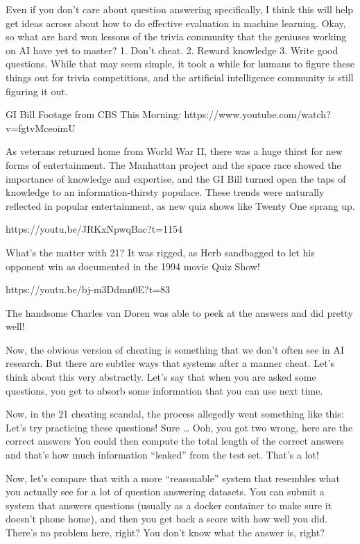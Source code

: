 Even if you don’t care about question answering specifically, I think this will help get ideas across about how to do effective evaluation in machine learning.
Okay, so what are hard won lessons of the trivia community that the geniuses working on AI have yet to master?  1.  Don’t cheat.  2.  Reward knowledge 3. Write good questions.  While that may seem simple, it took a while for humans to figure these things out for trivia competitions, and the artificial intelligence community is still figuring it out.

GI Bill Footage from CBS This Morning:
https://www.youtube.com/watch?v=fgtvMceoimU

As veterans returned home from World War II, there was a huge thirst for new forms of entertainment.  The Manhattan project and the space race showed the importance of knowledge and expertise, and the GI Bill turned open the taps of knowledge to an information-thirsty populace.  These trends were naturally reflected in popular entertainment, as new quiz shows like Twenty One sprang up.

https://youtu.be/JRKxNpwqBac?t=1154

What’s the matter with 21?  It was rigged, as Herb sandbagged to let his opponent win as documented in the 1994 movie Quiz Show!  

https://youtu.be/bj-m3Ddmn0E?t=83

The handsome Charles van Doren was able to peek at the answers and did pretty well!

Now, the obvious version of cheating is something that we don’t often see in AI research.  But there are subtler ways that systems after a manner cheat.  Let’s think about this very abstractly.  Let’s say that when you are asked some questions, you get to absorb some information that you can use next time.

Now, in the 21 cheating scandal, the process allegedly went something like this: 
Let’s try practicing these questions!
Sure …
Ooh, you got two wrong, here are the correct answers
You could then compute the total length of the correct answers and that’s how much information “leaked” from the test set.  That’s a lot!  

Now, let’s compare that with a more “reasonable” system that resembles what you actually see for a lot of question answering datasets.  You can submit a system that answers questions (usually as a docker container to make sure it doesn’t phone home), and then you get back a score with how well you did.  There’s no problem here, right?  You don’t know what the answer is, right?

